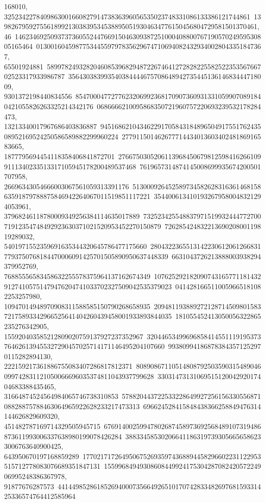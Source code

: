 {{{168010, 325234227840986300166082791473836396056535023748331086133386121744861\
1398267959275561899213038395345388950519304634776150456804729581501370461, 46\
14623469250937373605524476691504630938725100040880076719057024959530805165464\
0130016045987753445597978356296747106940824329340028043351847367, 65501924881\
58997824932820460853968294872267464127282822558252235356766702523317933986787\
35643038399354038444467570864894273544513614683444718009, 9301372198440834556\
85470004772776232069923681709073609313310599070891840421055826263325214342176\
0686666210095868350721960757220693239532178284473, 13213340017967686403836887\
94516862104346229170584318489650491755176243508952169524250586589882299960224\
27791150146267771443401360340248186916583665, 1877795694454118358406841872701\
27667503052061139684506798125984162661099111340233513317105945178200489537468\
7619657314874145008699935674200501707958, 26696343054666003067561059313391176\
51300092645258973458262831636146815863591879788875846942264067011519851117221\
3544006134101932679580048321294053961, 37968246118780009349256384114635017889\
73252342554883797151993244477270071912354748492923630371021520953452270150879\
72628542483221369020800119819289032, 5401971552359691635344320645786477175660\
28043223655131422306120612668317793750768184470006091425701505890950637448339\
6631043726213888003938294379952769, 76885556583458632255578375964137162674349\
10762529218209074316577118143291274105751479476204741033702327509042535379023\
0414281665110059665181082253257980, 10947014948970908311588585150790268658935\
20948119388927212871450980158372175893342966525641404260439458001933893844035\
181055452413050056322865235276342905, 155920403585212809020759137927237352967\
32044653499696858414551119195373764626139455327290457025714171146495204107660\
993809941868783843571252970115282894130, 222159217361886755083407286817812371\
80890867110514808792503590315489046099742831121050066696035374811043937799628\
3303147313106951512004292017404683388435465, 31664874524564984065746738310853\
57882044372253322864992725615633055687108828875788463064965922628233217473313\
696624528415848438366258849476314144626829609320, 451482787169714329505945715\
67691400259947802687458973692568489107319486873611993006337638980199078426284\
388334585302066411863197393056656586233006763640900425, 643950670197168859289\
17702171726495067526935974368894458296602231122953515712778083076689351847131\
1559968494930860844992417530428708242057224906995248386367978, 91877676287573\
44144985286185269400073566492651017074283348269768159331425336574764412585964\
}}}
